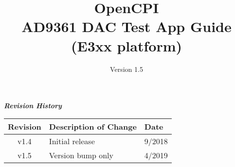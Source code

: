 \iffalse
This file is protected by Copyright. Please refer to the COPYRIGHT file
distributed with this source distribution.

This file is part of OpenCPI <http://www.opencpi.org>

OpenCPI is free software: you can redistribute it and/or modify it under the
terms of the GNU Lesser General Public License as published by the Free Software
Foundation, either version 3 of the License, or (at your option) any later
version.

OpenCPI is distributed in the hope that it will be useful, but WITHOUT ANY
WARRANTY; without even the implied warranty of MERCHANTABILITY or FITNESS FOR A
PARTICULAR PURPOSE. See the GNU Lesser General Public License for more details.

You should have received a copy of the GNU Lesser General Public License along
with this program. If not, see <http://www.gnu.org/licenses/>.
\fi

\def\docTitle{OpenCPI\\ AD9361 DAC Test App Guide (E3xx platform)}
\def\docVersion{1.5}
\def\snippetpath{../../../../../../doc/av/tex/snippets}


\date{Version \docVersion} %
\title{\docTitle}
\usepackage{graphicx}
\graphicspath{ {figures/} }
\usepackage{textcomp}
\usepackage{listings}


\maketitle
	\begin{center}
	\textit{\textbf{Revision History}}
		\begin{table}[H]
		\label{table:revisions} %
			\begin{tabularx}{\textwidth}{|c|X|l|}
			\hline
			\rowcolor{blue}
			\textbf{Revision} & \textbf{Description of Change} & \textbf{Date} \\
		    \hline
		    v1.4 & Initial release & 9/2018 \\
			\hline
		    v1.5 & Version bump only & 4/2019 \\
			\hline
			\end{tabularx}
		\end{table}
	\end{center}

